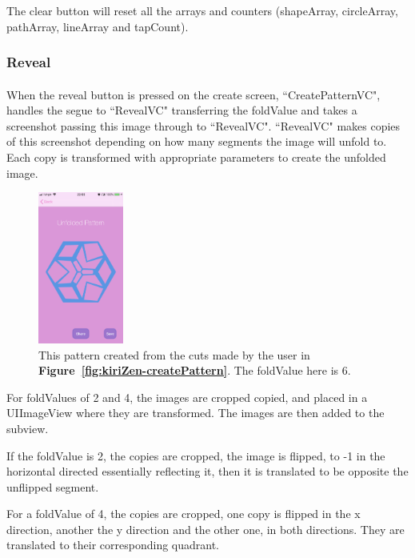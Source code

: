\documentclass[11pt]{article}
\begin{document}
              The clear button will reset all the arrays and counters (shapeArray, circleArray, pathArray, lineArray and tapCount).
    

    \subsubsection{Reveal}
            \paragraph{}
            When the reveal button is pressed on the create screen, ``CreatePatternVC", handles the segue to ``RevealVC" transferring the foldValue and takes a screenshot passing this image through to ``RevealVC". ``RevealVC" makes copies of this screenshot depending on how many segments the image will unfold to. Each copy is transformed with appropriate parameters to create the unfolded image.  \begin{figure}
                        \centering
                        \includegraphics[width=0.25\textwidth]{KiriZen/createUnfoldedPattern}
                        \caption{This pattern created from the cuts made by the user in \textbf{Figure~\ref{fig:kiriZen-createPattern}}. The foldValue here is 6.}
                        \label{fig:kiriZen-createUnfoldedPattern}
                    \end{figure}
            For foldValues of 2 and 4, the images are cropped copied, and placed in a UIImageView where they are transformed. The images are then added to the subview. 
            
            If the foldValue is 2, the copies are cropped, the image is flipped, to -1 in the horizontal directed essentially reflecting it, then it is translated to be opposite the unflipped segment. 
            
            For a foldValue of 4, the copies are cropped, one copy is flipped in the x direction, another the y direction and the other one, in both directions. They are translated to their corresponding quadrant. 
                    
\end{document}
